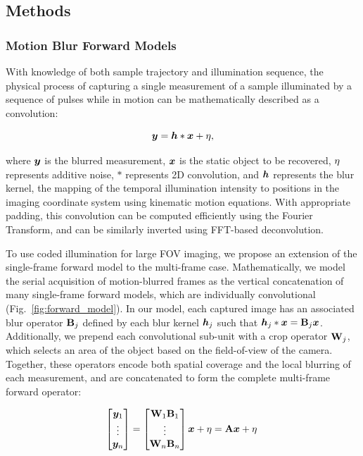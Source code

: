 \subsection{Methods}
\subsubsection{Motion Blur Forward Models}
With knowledge of both sample trajectory and illumination sequence, the physical process of capturing a single measurement of a sample illuminated by a sequence of pulses while in motion can be mathematically described as a convolution:

\begin{equation}
\label{eq:single_forward}
\bm{y} = \bm{h} * \bm{x} + {\eta},
\end{equation}

\noindent where $\bm{y}$ is the blurred measurement, $\bm{x}$ is the static object to be recovered, ${\eta}$ represents additive noise, $*$ represents 2D convolution, and $\bm{h}$ represents the blur kernel, the mapping of the temporal illumination intensity to positions in the imaging coordinate system using kinematic motion equations. With appropriate padding, this convolution can be computed efficiently using the Fourier Transform, and can be similarly inverted using FFT-based deconvolution.

To use coded illumination for large FOV imaging, we propose an extension of the single-frame forward model to the multi-frame case.
Mathematically, we model the serial acquisition of motion-blurred frames as the vertical concatenation of many single-frame forward models, which are individually convolutional (Fig.~\ref{fig:forward_model}).
In our model, each captured image has an associated blur operator $\mathbf{B}_j$ defined by each blur kernel $\bm{h}_j$ such that $\bm{h}_j * \bm{x} = \mathbf{B}_j \bm{x}$.
Additionally, we prepend each convolutional sub-unit with a crop operator $\mathbf{W}_j$, which selects an area of the object based on the field-of-view of the camera. Together, these operators encode both spatial coverage and the local blurring of each measurement, and are concatenated to form the complete multi-frame forward operator:

\begin{equation}
\label{eq:multiframe_forward}
\begin{bmatrix}\bm{y}_1\\ \vdots \\ \bm{y}_n \end{bmatrix} = \begin{bmatrix}\mathbf{W}_1\mathbf{B}_1 \\ \vdots \\ \mathbf{W}_n \mathbf{B}_n \end{bmatrix} \bm{x} + {\eta} = \mathbf{A}\bm{x} + {\eta}\:
\end{equation}

